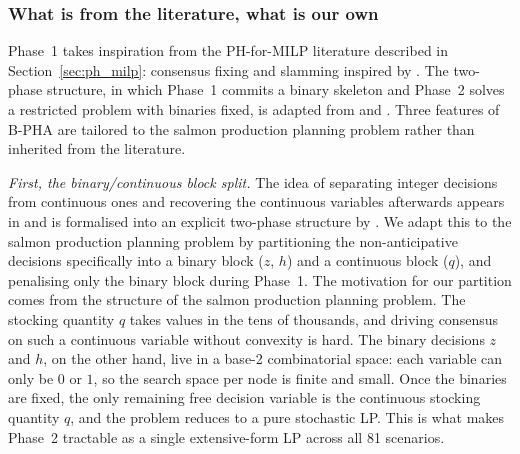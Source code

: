 \documentclass[12pt,a4paper]{article}
\begin{document}
\subsubsection{What is from the literature, what is our own}
\label{sec:lit_vs_own}

Phase~1 takes inspiration from the PH-for-MILP literature described in
Section~\ref{sec:ph_milp}: consensus fixing \citep{watson2011progressive} and slamming
inspired by \citet{watson2011progressive}. The two-phase structure, in which Phase~1
commits a binary skeleton and Phase~2 solves a restricted problem with binaries fixed,
is adapted from \citet{lokketangen1996progressive} and \citet{crainic2009progressive}.
Three features of B-PHA are tailored to the salmon production planning problem rather
than inherited from the literature.


\textit{First, the binary/continuous block split.} The idea of separating integer
decisions from continuous ones and recovering the continuous variables afterwards
appears in \citet{lokketangen1996progressive} and is formalised into an explicit
two-phase structure by \citet{crainic2009progressive}. We adapt this to the salmon
production planning problem by partitioning the non-anticipative decisions specifically
into a binary block ($z$, $h$) and a continuous block ($q$), and penalising only the
binary block during Phase~1. The motivation for our partition comes from the structure
of the salmon production planning problem. The stocking quantity $q$ takes values in
the tens of thousands, and driving consensus on such a continuous variable without
convexity is hard. The binary decisions $z$ and $h$, on the other hand, live in a base-2
combinatorial space: each variable can only be $0$ or $1$, so the search space per node
is finite and small. 
Once the binaries are fixed, the only
remaining free decision variable is the continuous stocking quantity $q$, and the
problem reduces to a pure stochastic LP. This is what makes Phase~2 tractable as a
single extensive-form LP across all 81 scenarios.
\end{document}
